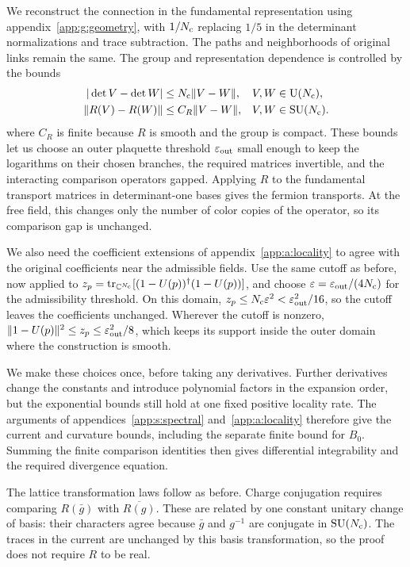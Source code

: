 \documentclass[11pt,a4paper]{article}
\theoremstyle{remark}
\DeclareMathOperator{\tr}{tr}
\DeclareMathOperator{\SU}{SU}
\newcommand{\eps}{\varepsilon}
\begin{document}
We reconstruct the connection in the fundamental representation using
appendix~\ref{app:g:geometry}, with $1/N_{\rm c}$ replacing $1/5$ in
the determinant normalizations and trace subtraction. The paths and
neighborhoods of original links remain the same. The group and
representation dependence is controlled by the bounds
\begin{equation}
 \begin{aligned}
 |\det V-\det W|&\le N_{\rm c}\|V-W\|,
       &&V,W\in\mathrm{U}(N_{\rm c}),\\
 \|R(V)-R(W)\|&\le C_R\|V-W\|,
       &&V,W\in\SU(N_{\rm c}).
 \end{aligned}
\end{equation}
where $C_R$ is finite because $R$ is smooth and the group is compact.
These bounds let us choose an outer plaquette threshold $\eps_{\rm out}$
small enough to keep the logarithms on their chosen branches, the
required matrices invertible, and the interacting comparison operators
gapped. Applying $R$ to the fundamental transport matrices in
determinant-one bases gives the fermion transports. At the free field,
this changes only the number of color copies of the operator, so its
comparison gap is unchanged.

We also need the coefficient extensions of appendix~\ref{app:a:locality}
to agree with the original coefficients near the admissible fields.
Use the same cutoff as before, now applied to
$z_p=\tr_{\mathbb C^{N_{\rm c}}}[(1-U(p))^\dagger(1-U(p))]$,
and choose $\eps=\eps_{\rm out}/(4N_{\rm c})$ for the admissibility
threshold. On this domain,
$z_p\le N_{\rm c}\eps^2<\eps_{\rm out}^2/16$, so the cutoff leaves
the coefficients unchanged. Wherever the cutoff is nonzero,
$\|1-U(p)\|^2\le z_p\le\eps_{\rm out}^2/8$, which keeps its support
inside the outer domain where the construction is smooth.

We make these choices once, before taking any derivatives. Further
derivatives change the constants and introduce polynomial factors in
the expansion order, but the exponential bounds still hold at one
fixed positive locality rate. The arguments of
appendices~\ref{app:s:spectral} and~\ref{app:a:locality} therefore give
the current and curvature bounds, including the separate finite bound
for $B_0$. Summing the finite comparison identities then gives
differential integrability and the required divergence equation.

The lattice transformation laws follow as before. Charge conjugation
requires comparing $R(\bar g)$ with $\overline{R(g)}$. These are related
by one constant unitary change of basis: their characters agree because
$\bar g$ and $g^{-1}$ are conjugate in $\SU(N_{\rm c})$. The traces
in the current are unchanged by this basis transformation, so the proof
does not require $R$ to be real.
\end{document}
